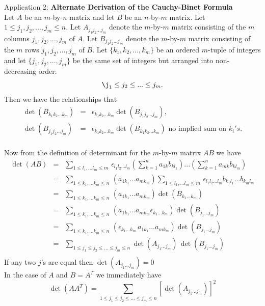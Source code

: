 Application 2: {\bf Alternate Derivation of the Cauchy-Binet Formula}\\
Let $A$ be an $m$-by-$n$ matrix and let $B$ be an $n$-by-$m$ matrix. Let $1\le j_1,j_2,...,j_m\le n$.
Let $A_{j_1j_2...j_m}$ denote the $m$-by-$m$ matrix consisting of the $m$ columns $j_1,j_2,...,j_m$ of $A$.
Let $B_{j_1j_2...j_m}$ denote the $m$-by-$m$ matrix consisting of the $m$ rows $j_1,j_2,...,j_m$ of $B$.
Let $\{k_1,k_2,...,k_m\}$ be an ordered $m$-tuple of integers and let $\{j_1,j_2,...,j_m\}$ be the same set of integers but arranged into non-decreasing order:
$$\j_1\le j_2 \le ... \le j_m.$$
Then we have the relationships that
\begin{eqnarray*}
\det \left(B_{k_1k_2...k_m}\right) &=& \epsilon_{k_1k_2...k_m} \det \left(B_{j_1j_2...j_m}\right),\\
\det \left(B_{j_1j_2...j_m} \right) &=& \epsilon_{k_1k_2...k_m} \det \left(B_{k_1k_2...k_m}\right)\mbox{ no implied sum on } k_i's.
\end{eqnarray*}\\
Now from the definition of determinant for the $m$-by-$m$ matrix $AB$ we have
\begin{eqnarray*}
\det (AB) &=& \sum_{1\le l_1,...l_m \le m} \, \epsilon_{l_1l_2...l_m} \left( \sum_{k=1}^n a_{1k} b_{kl_1} \right) ... \left( \sum_{k=1}^n a_{mk}b_{kl_m}\right) \\
&=& \sum_{1\le k_1,...k_m \le n} \, \left(a_{1k_1}...a_{mk_m}\right) \sum_{1\le l_1,...l_m \le m} \, \epsilon_{l_1l_2...l_m} b_{k_1l_1} ... b_{k_ml_m} \\
&=& \sum_{1\le k_1,...k_m \le n} \, \left( a_{1k_1}...a_{mk_m} \right) \det \left(B_{k_1...k_m}\right)\\
&=& \sum_{1\le k_1,...k_m \le n} \, \left(a_{1k_1}...a_{mk_m} \epsilon_{k_1...k_m}\right) \det \left(B_{j_1...j_m}\right)\\
&=& \sum_{1\le k_1,...k_m \le n} \, \left(\epsilon_{k_1...k_m} \, a_{1k_1}...a_{mk_m}\right) \det \left(B_{j_1...j_m}\right)\\
&=& \sum_{1\le j_1 \le j_2 \le ...\le j_m \le n} \det \left(A_{j_1...j_m}\right)\,\det \left(B_{j_1...j_m}\right) \\
\end{eqnarray*}
If any two $j$'s are equal then $\det \left(A_{j_1...j_m}\right) = 0$\\
In the case of $A$ and $B = A^T$ we immediately have
$$ \det (AA^T) = \sum_{1\le j_1 \le j_2 \le ...\le j_m \le n} \left[ \det \left(A_{j_1...j_m}\right)\right]^2 $$
